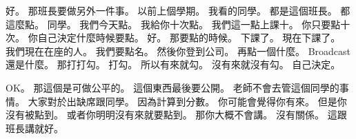 \hypertarget{c01:cue:1842}{}好。
\hypertarget{c01:cue:1843}{}那班長要做另外一件事。
\hypertarget{c01:cue:1844}{}以前上個學期。
\hypertarget{c01:cue:1845}{}我看的同學。
\hypertarget{c01:cue:1846}{}都是這個班長。
\hypertarget{c01:cue:1847}{}都這麼點。
\hypertarget{c01:cue:1848}{}同學。
\hypertarget{c01:cue:1849}{}我們今天點。
\hypertarget{c01:cue:1850}{}我給你十次點。
\hypertarget{c01:cue:1851}{}我們這一點上課十。
\hypertarget{c01:cue:1852}{}你只要點十次。
\hypertarget{c01:cue:1853}{}你自己決定什麼時候要點。
\hypertarget{c01:cue:1854}{}好。
\hypertarget{c01:cue:1855}{}那要點的時候。
\hypertarget{c01:cue:1856}{}下課了。
\hypertarget{c01:cue:1857}{}現在下課了。
\hypertarget{c01:cue:1858}{}我們現在在座的人。
\hypertarget{c01:cue:1859}{}我們要點名。
\hypertarget{c01:cue:1860}{}然後你登到公司。
\hypertarget{c01:cue:1861}{}再點一個什麼。
\hypertarget{c01:cue:1862}{}Broadcast 還是什麼。
\hypertarget{c01:cue:1863}{}那打打勾。
\hypertarget{c01:cue:1864}{}打勾。
\hypertarget{c01:cue:1865}{}所以有來就勾。
\hypertarget{c01:cue:1866}{}沒有來就沒有勾。
\hypertarget{c01:cue:1867}{}自己決定。

\hypertarget{c01:cue:1868}{}OK。
\hypertarget{c01:cue:1869}{}那這個是可做公平的。
\hypertarget{c01:cue:1870}{}這個東西最後要公開。
\hypertarget{c01:cue:1871}{}老師不會去管這個同學的事情。
\hypertarget{c01:cue:1872}{}大家對於出缺席跟同學。
\hypertarget{c01:cue:1873}{}因為計算到分數。
\hypertarget{c01:cue:1874}{}你可能會覺得你有來。
\hypertarget{c01:cue:1875}{}但是你沒有被點到。
\hypertarget{c01:cue:1876}{}或者你明明沒有來就要點到。
\hypertarget{c01:cue:1877}{}那你大概不會講。
\hypertarget{c01:cue:1878}{}沒有關係。
\hypertarget{c01:cue:1879}{}這跟班長講就好。

